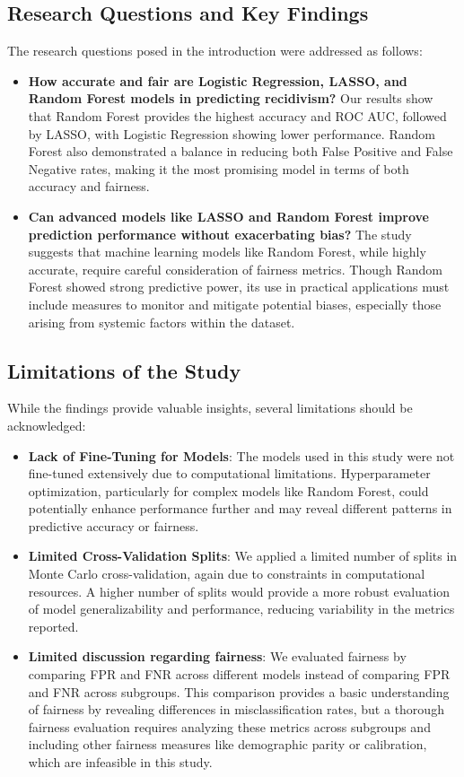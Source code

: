 \documentclass[12pt]{article}
\begin{document}
\subsection{Research Questions and Key Findings}

The research questions posed in the introduction were addressed as follows:
\begin{itemize}
    \item \textbf{How accurate and fair are Logistic Regression, LASSO, and Random Forest models in predicting recidivism?} Our results show that Random Forest provides the highest accuracy and ROC AUC, followed by LASSO, with Logistic Regression showing lower performance. Random Forest also demonstrated a balance in reducing both False Positive and False Negative rates, making it the most promising model in terms of both accuracy and fairness.
    \item \textbf{Can advanced models like LASSO and Random Forest improve prediction performance without exacerbating bias?} The study suggests that machine learning models like Random Forest, while highly accurate, require careful consideration of fairness metrics. Though Random Forest showed strong predictive power, its use in practical applications must include measures to monitor and mitigate potential biases, especially those arising from systemic factors within the dataset.
\end{itemize}

\subsection{Limitations of the Study}

While the findings provide valuable insights, several limitations should be acknowledged:
\begin{itemize}
    \item \textbf{Lack of Fine-Tuning for Models}: The models used in this study were not fine-tuned extensively due to computational limitations. Hyperparameter optimization, particularly for complex models like Random Forest, could potentially enhance performance further and may reveal different patterns in predictive accuracy or fairness.
    \item \textbf{Limited Cross-Validation Splits}: We applied a limited number of splits in Monte Carlo cross-validation, again due to constraints in computational resources. A higher number of splits would provide a more robust evaluation of model generalizability and performance, reducing variability in the metrics reported.
    \item \textbf{Limited discussion regarding fairness}: We evaluated fairness by comparing FPR and FNR across different models instead of comparing FPR and FNR across subgroups. This comparison provides a basic understanding of fairness by revealing differences in misclassification rates, but a thorough fairness evaluation requires analyzing these metrics across subgroups and including other fairness measures like demographic parity or calibration, which are infeasible in this study.
\end{itemize}
\end{document}
